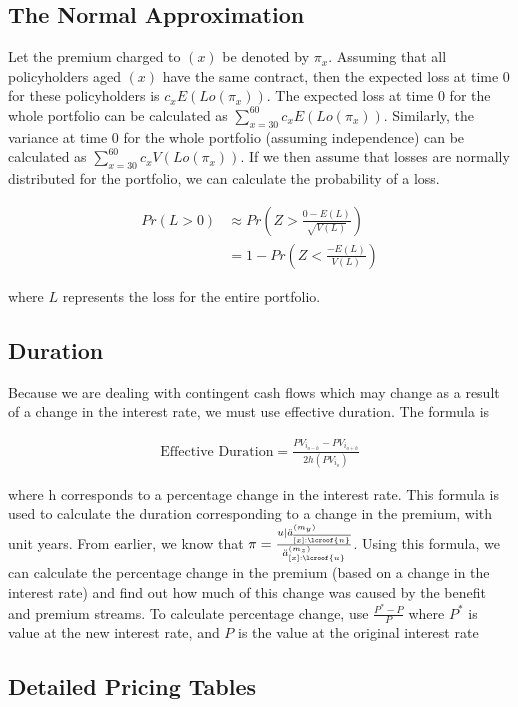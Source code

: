 \documentclass[12pt]{article}
\begin{document}
\subsection{The Normal Approximation}

Let the premium charged to $(x)$ be denoted by $\pi_x$. Assuming that all policyholders aged $(x)$ have the same contract, then the expected loss at time 0 for these policyholders is $c_xE(Lo(\pi_x))$. The expected loss at time 0 for the whole portfolio can be calculated as $\sum_{x=30}^{60}c_xE(Lo(\pi_x))$. Similarly, the variance at time 0 for the whole portfolio (assuming independence) can be calculated as $\sum_{x=30}^{60}c_xV(Lo(\pi_x))$. If we then assume that losses are normally distributed for the portfolio, we can calculate the probability of a loss.

\begin{align*}
Pr(L>0) &\approx Pr(Z> \frac{0-E(L)}{\sqrt{V(L)}}) \\
&= 1 - Pr(Z< \frac{-E(L)}{V(L)}) 
\end{align*}

where $L$ represents the loss for the entire portfolio.

\subsection{Duration}

Because we are dealing with contingent cash flows which may change as a result of a change in the interest rate, we must use effective duration. The formula is

\begin{align*}
\mbox{Effective Duration} = \frac{PV_{i_{o-h}} - PV_{i_{o+h}}}{2h(PV_{i_o})}
\end{align*}

where h corresponds to a percentage change in the interest rate. This formula is used to calculate the duration corresponding to a change in the premium, with unit years. From earlier, we know that
$\pi= \frac{u|\ddot{a}_{\overline{[x]:\lcroof{n}}}^{(m_y)}}{\ddot{a}_{[x]:\lcroof{u}}^{(m_z)}}$. Using this formula, we can calculate the percentage change in the premium (based on a change in the interest rate) and find out how much of this change was caused by the benefit and premium streams. To calculate percentage change, use $\frac{P^* - P}{P}$ where $P^*$ is value at the new interest rate, and $P$ is the value at the original interest rate

\subsection{Detailed Pricing Tables}
\end{document}
